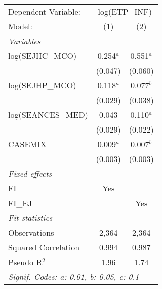 
\begingroup
\centering
\begin{tabular}{lcc}
   \tabularnewline \midrule \midrule
   Dependent Variable: & \multicolumn{2}{c}{log(ETP\_INF)}\\
   Model:              & (1)         & (2)\\  
   \midrule
   \emph{Variables}\\
   log(SEJHC\_MCO)     & 0.254$^{a}$ & 0.551$^{a}$\\   
                       & (0.047)     & (0.060)\\   
   log(SEJHP\_MCO)     & 0.118$^{a}$ & 0.077$^{b}$\\   
                       & (0.029)     & (0.038)\\   
   log(SEANCES\_MED)   & 0.043       & 0.110$^{a}$\\   
                       & (0.029)     & (0.022)\\   
   CASEMIX             & 0.009$^{a}$ & 0.007$^{b}$\\   
                       & (0.003)     & (0.003)\\   
   \midrule
   \emph{Fixed-effects}\\
   FI                  & Yes         & \\  
   FI\_EJ              &             & Yes\\  
   \midrule
   \emph{Fit statistics}\\
   Observations        & 2,364       & 2,364\\  
   Squared Correlation & 0.994       & 0.987\\  
   Pseudo R$^2$        & 1.96        & 1.74\\  
   \midrule \midrule
   \multicolumn{3}{l}{\emph{Signif. Codes: a: 0.01, b: 0.05, c: 0.1}}\\
\end{tabular}
\par\endgroup


